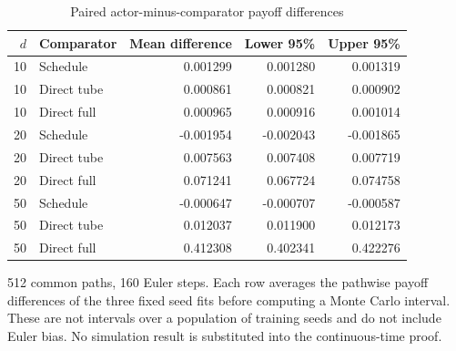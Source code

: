 \begin{table}[htbp]
\centering\small
\caption{Paired actor-minus-comparator payoff differences}\label{tab:r10paired}
\begin{tabular}{rlrrr}
\toprule
$d$ & Comparator & Mean difference & Lower 95\% & Upper 95\%\\
\midrule
10 & Schedule & 0.001299 & 0.001280 & 0.001319\\
10 & Direct tube & 0.000861 & 0.000821 & 0.000902\\
10 & Direct full & 0.000965 & 0.000916 & 0.001014\\
20 & Schedule & -0.001954 & -0.002043 & -0.001865\\
20 & Direct tube & 0.007563 & 0.007408 & 0.007719\\
20 & Direct full & 0.071241 & 0.067724 & 0.074758\\
50 & Schedule & -0.000647 & -0.000707 & -0.000587\\
50 & Direct tube & 0.012037 & 0.011900 & 0.012173\\
50 & Direct full & 0.412308 & 0.402341 & 0.422276\\
\bottomrule
\end{tabular}
\par\smallskip\begin{minipage}{.97\linewidth}\footnotesize 512 common paths, 160 Euler steps. Each row averages the pathwise payoff differences of the three fixed seed fits before computing a Monte Carlo interval. These are not intervals over a population of training seeds and do not include Euler bias. No simulation result is substituted into the continuous-time proof.\end{minipage}
\end{table}
